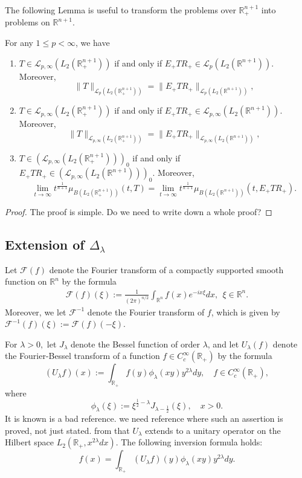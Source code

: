 \documentclass[12pt]{amsart}
\begin{document}
The following Lemma is useful to transform the problems over $\mathbb{R}_+^{n+1}$ into problems on $\mathbb{R}^{n+1}$.
\begin{lemma}\label{half}
For any  $1\leq p<\infty$, we have
\begin{enumerate}
  \item $T\in\mathcal{L}_{p,\infty}(L_2(\mathbb{R}_+^{n+1}))$ if and only if $E_+TR_+\in\mathcal{L}_{p}(L_2(\mathbb{R}^{n+1}))$. Moreover,
      $$\|T\|_{\mathcal{L}_{p}(L_2(\mathbb{R}_+^{n+1}))}=\|E_+TR_+\|_{\mathcal{L}_{p}(L_2(\mathbb{R}^{n+1}))},$$
  \item $T\in\mathcal{L}_{p,\infty}(L_2(\mathbb{R}_+^{n+1}))$ if and only if $E_+TR_+\in\mathcal{L}_{p,\infty}(L_2(\mathbb{R}^{n+1}))$. Moreover,
      $$\|T\|_{\mathcal{L}_{p,\infty}(L_2(\mathbb{R}_+^{n+1}))}=\|E_+TR_+\|_{\mathcal{L}_{p,\infty}(L_2(\mathbb{R}^{n+1}))},$$
  \item $T\in(\mathcal{L}_{p,\infty}(L_2(\mathbb{R}_+^{n+1})))_0$ if and only if $E_+TR_+\in(\mathcal{L}_{p,\infty}(L_2(\mathbb{R}^{n+1})))_0$. Moreover,
      $$\lim_{t\to\infty}t^{\frac1{n+1}}\mu_{B(L_2(\mathbb{R}_+^{n+1}))}(t,T)=\lim_{t\to\infty}t^{\frac1{n+1}}\mu_{B(L_2(\mathbb{R}^{n+1}))}(t,E_+TR_+).$$
\end{enumerate}
\end{lemma}
\begin{proof}
 {\color{blue}The proof is simple. Do we need to write down a whole proof?}
\end{proof}

\subsection{\color{red}Extension of $\Delta_\lambda$}
Let $\mathcal{F}(f)$ denote the Fourier transform of a compactly supported smooth function on $\mathbb{R}^n$ by the formula
\begin{align*}
\mathcal{F}(f)(\xi):=\frac{1}{(2\pi)^{n/2}}\int_{\mathbb{R}^{n}}f(x)e^{-ix\xi}dx, \ \ \xi\in\mathbb{R}^{n}.
\end{align*}
Moreover, we let $\mathcal{F}^{-1}$ denote the Fourier transform of $f$, which is given by $\mathcal{F}^{-1}(f)(\xi):=\mathcal{F}(f)(-\xi)$.

For $\lambda>0,$ let $J_\lambda$ denote the Bessel function of order $\lambda$, and let $U_{\lambda}(f)$ denote the Fourier-Bessel transform of a function $f\in C^{\infty}_c(\mathbb{R}_+)$ by the formula
$$(U_{\lambda}f)(x):=\int_{\mathbb{R}_+}f(y)\phi_\lambda(xy)y^{2\lambda}dy,\quad f\in C^{\infty}_c(\mathbb{R}_+),$$
where
$$\phi_\lambda(\xi):=\xi^{\frac12-\lambda}J_{\lambda-\frac12}(\xi),\quad x>0.$$
It is known {\color{red} \cite{MS} is a bad reference. we need reference where such an assertion is proved, not just stated.} from \cite{MS} that $U_{\lambda}$ extends to a unitary operator on the Hilbert space $L_2(\mathbb{R}_+,x^{2\lambda}dx).$ The following inversion formula holds:
$$f(x)=\int_{\mathbb{R}_+} (U_{\lambda}f)(y)\phi_{\lambda}(xy)y^{2\lambda}dy.$$
\end{document}

